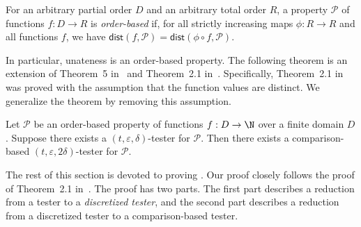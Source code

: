 \documentclass{toc}
\newcommand{\eps}{\varepsilon}
\newcommand{\cP}{\ensuremath{\mathcal{P}}}
\newcommand{\dist}{\mathsf{dist}}
\newcommand{\Thm}[1]{\expref{Theorem}{thm:#1}}
\begin{document}
\begin{definition}\label{def:obp}
For an arbitrary partial order $D$ and an arbitrary total order $R$, a property $\cP$ of functions $f:D \to R$ is \emph{order-based} if,
for all strictly increasing maps $\phi: R \to R$ and all functions $f$, we have $\dist(f,\cP) = \dist(\phi\circ f, \cP)$.
\end{definition}

In particular, unateness is an order-based property.
The following theorem is an extension of Theorem~5 in~\cite{Fis04} and Theorem~2.1 in~\cite{CS14}.
Specifically, Theorem~2.1 in~\cite{CS14} was proved with the assumption that the function values are distinct. We generalize
%
the theorem
by removing this assumption.

\begin{theorem}\label{thm:CS14}
Let $\cP$ be an order-based property of functions $f:D \to \N$ over a finite domain $D$. Suppose there exists a $(t,\eps,\delta)$-tester for $\cP$.
Then there exists a comparison-based $(t,\eps,2\delta)$-tester
for $\cP$.
\end{theorem}

The rest of this section is devoted to proving \Thm{CS14}.
Our proof closely follows the proof of Theorem~2.1 in~\cite{CS14}.
The proof has two parts. The first part describes a reduction from a tester to a \emph{discretized tester}, and the second part describes a reduction from a discretized tester to a comparison-based tester.
\end{document}
